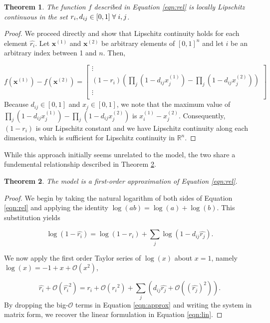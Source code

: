 \documentclass{article}
\newtheorem{thm}{Theorem}
\begin{document}
\begin{thm}
\label{thm:lipschitz}
The function $f$ described in Equation \ref{eqn:rel} is locally Lipschitz continuous in the set $r_i, d_{ij} \in [0,1] \hspace{1mm} \forall \hspace{1mm} i,j$.
\end{thm}
\begin{proof}
We proceed directly and show that Lipschitz continuity holds for each element $\hat{r_i}$. Let $\mathbf{x}^{(1)}$ and $\mathbf{x}^{(2)}$ be arbitrary elements of $[0,1]^n$ and let $i$ be an arbitrary index between 1 and $n$. Then, 

\begin{equation}
f\left(\mathbf{x}^{(1)}\right) - f\left(\mathbf{x}^{(2)}\right) = 
\begin{bmatrix}
\vdots \\
(1-r_i)\left( \prod_j \left(1-d_{ij} x_j^{(1)} \right) -  \prod_j \left(1-d_{ij} x_j^{(2)} \right) \right)\\
\vdots\\
\end{bmatrix}
\end{equation}
Because $d_{ij}\in [0,1]$ and $x_{j}\in [0,1]$, we note that the maximum value of $\prod_j \left(1-d_{ij} x_j^{(1)} \right) -  \prod_j \left(1-d_{ij} x_j^{(2)} \right)$ is $x_i^{(1)} - x_j^{(2)}$. Consequently, $(1-r_i)$ is our Lipschitz constant and we have Lipschitz continuity along each dimension, which is sufficient for Lipschitz continuity in $\mathbb{R}^n$.
\end{proof}

While this approach initially seems unrelated to the \citeauthor{haimes-iiom} model, the two share a fundemental relationship described in Theorem \ref{thm:first-order}. 
\begin{thm}
\label{thm:first-order}
The \citeauthor{haimes-iiom} model is a first-order approximation of Equation \ref{eqn:rel}.
\end{thm}
\begin{proof}
We begin by taking the natural logarithm of both sides of Equation \ref{eqn:rel} and applying the identity $\log(ab) = \log(a) + \log(b)$. This substitution yields

\begin{equation}
\log(1-\hat{r_i}) = \log(1-r_i) + \sum_j \log( 1-d_{ij}\hat{r_j}).
\end{equation}

We now apply the first order Taylor series of $\log(x)$ about $x=1$, namely $\log(x) = -1 + x + \mathcal{O}\left(x^2\right)$,

\begin{equation}
\label{eqn:approx}
\hat{r_i} + \mathcal{O}(\hat{r_i}^2) = {r_i} + \mathcal{O}\left({r_i}^2\right) + \sum_j \left(d_{ij}\hat{r_j} + \mathcal{O}\left((\hat{r_j})^2 \right)\right).
\end{equation}
By dropping the big-$\mathcal{O}$ terms in Equation \ref{eqn:approx} and writing the system in matrix form, we recover the linear formulation in Equation \ref{eqn:lin}.
\end{proof}
\end{document}
